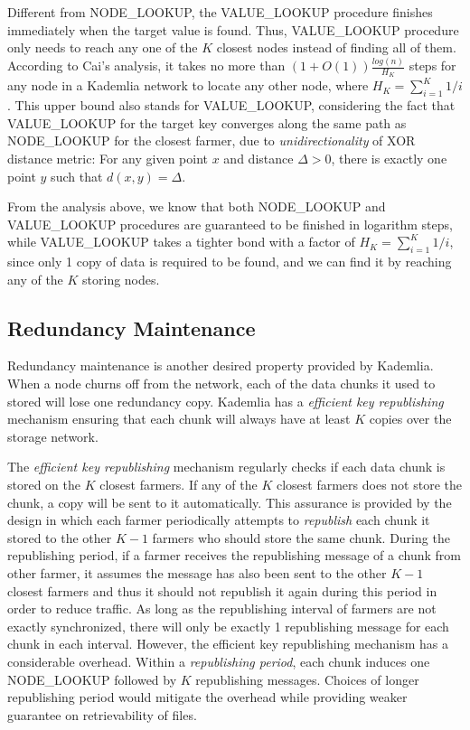 Different from NODE\_LOOKUP, the VALUE\_LOOKUP procedure finishes immediately when the target value is found. Thus, VALUE\_LOOKUP procedure only needs to reach any one of the $K$ closest nodes instead of finding all of them. According to Cai's analysis\cite{cai2013probabilistic}, it takes no more than $(1+O(1))\frac{log(n)}{H_{K}}$ steps for any node in a Kademlia network to locate any other node, where $H_K = \sum_{i=1}^{K} 1/i$. This upper bound also stands for VALUE\_LOOKUP, considering the fact that VALUE\_LOOKUP for the target key converges along the same path as NODE\_LOOKUP for the closest farmer, due to \textit{unidirectionality} of XOR distance metric: For any given point $x$ and distance $\Delta>0$, there is exactly one point $y$ such that $d(x,y)=\Delta$.

From the analysis above, we know that both NODE\_LOOKUP and VALUE\_LOOKUP procedures are guaranteed to be finished in logarithm steps, while VALUE\_LOOKUP takes a tighter bond with a factor of $H_K = \sum_{i=1}^{K} 1/i$, since only 1 copy of data is required to be found, and we can find it by reaching any of the $K$ storing nodes.

\subsection{Redundancy Maintenance}
\label{ss:redundancymaintenance}
Redundancy maintenance is another desired property provided by Kademlia. When a node churns off from the network, each of the data chunks it used to stored will lose one redundancy copy. Kademlia has a \textit{efficient key republishing} mechanism ensuring that each chunk will always have at least $K$ copies over the storage network.

The \textit{efficient key republishing} mechanism regularly checks if each data chunk is stored on the $K$ closest farmers. If any of the $K$ closest farmers does not store the chunk, a copy will be sent to it automatically. This assurance is provided by the design in which each farmer periodically attempts to \textit{republish} each chunk it stored to the other $K-1$ farmers who should store the same chunk. During the republishing period, if a farmer receives the republishing message of a chunk from other farmer, it assumes the message has also been sent to the other $K-1$ closest farmers and thus it should not republish it again during this period in order to reduce traffic. As long as the republishing interval of farmers are not exactly synchronized, there will only be exactly 1 republishing message for each chunk in each interval. However, the efficient key republishing mechanism has a considerable overhead. Within a \textit{republishing period}, each chunk induces one NODE\_LOOKUP followed by $K$ republishing messages. Choices of longer republishing period would mitigate the overhead while providing weaker guarantee on retrievability of files.

